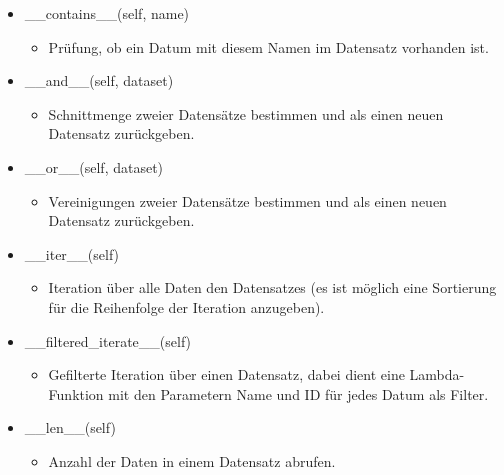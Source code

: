 \documentclass{article}
\begin{document}
\begin{itemize}
	\item \_\_contains\_\_(self, name)
	\begin{itemize}
		\item[] Prüfung, ob ein Datum mit diesem Namen im Datensatz vorhanden ist.
	\end{itemize}
\end{itemize}

\begin{itemize}
	\item \_\_and\_\_(self, dataset)
	\begin{itemize}
		\item[] Schnittmenge zweier Datensätze bestimmen und als einen neuen Datensatz zurückgeben.
	\end{itemize}
\end{itemize}

\begin{itemize}
	\item \_\_or\_\_(self, dataset)
	\begin{itemize}
		\item[] Vereinigungen zweier Datensätze bestimmen und als einen neuen Datensatz zurückgeben.
	\end{itemize}
\end{itemize}

\begin{itemize}
	\item \_\_iter\_\_(self)
	\begin{itemize}
		\item[] Iteration über alle Daten den Datensatzes (es ist möglich eine Sortierung
		für die Reihenfolge der Iteration anzugeben).
	\end{itemize}
\end{itemize}


\begin{itemize}
	\item \_\_filtered\_iterate\_\_(self)
	\begin{itemize}
		\item[] Gefilterte Iteration über einen Datensatz, dabei dient eine Lambda-Funktion mit den Parametern Name und ID für jedes Datum als Filter.
	\end{itemize}
\end{itemize}

\begin{itemize}
	\item \_\_len\_\_(self)
	\begin{itemize}
		\item[] Anzahl der Daten in einem Datensatz abrufen.
	\end{itemize}
\end{itemize}
\end{document}
